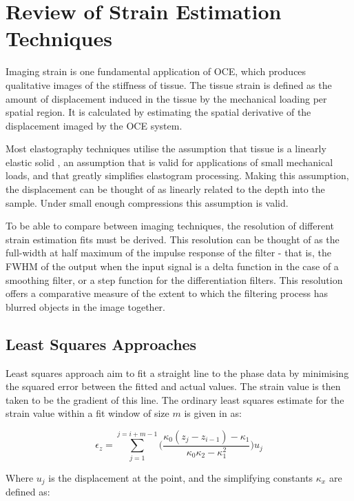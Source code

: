 \chapter{Review of Strain Estimation Techniques}\label{review}

Imaging strain is one fundamental application of OCE, which produces qualitative images of the stiffness of tissue. The tissue strain is defined as the amount of displacement induced in the tissue by the mechanical loading per spatial region. It is calculated by estimating the spatial derivative of the displacement imaged by the OCE system. 

Most elastography techniques utilise the assumption that tissue is a linearly elastic solid \cite{kennedy_review_2014}, an assumption that is valid for applications of small mechanical loads, and that greatly simplifies elastogram processing. Making this assumption, the displacement can be thought of as linearly related to the depth into the sample. Under small enough compressions this assumption is valid. 

To be able to compare between imaging techniques, the resolution of different strain estimation fits must be derived. This resolution can be thought of as the full-width at half maximum of the impulse response of the filter - that is, the FWHM of the output when the input signal is a delta function in the case of a smoothing filter, or a step function for the differentiation filters. This resolution offers a comparative measure of the extent to which the filtering process has blurred objects in the image together. 

\section{Least Squares Approaches}\label{least_squares}
Least squares approach aim to fit a straight line to the phase data by minimising the squared error between the fitted and actual values. The strain value is then taken to be the gradient of this line. The ordinary least squares estimate for the strain value within a fit window of size $m$ is given in \cite{kennedy_strain_2012} as:

\begin{equation}
	\label{ols_strain}
	\epsilon_z = \sum\limits_{j=1}^{j=i+m-1} \bigg(\frac{\kappa_0 (z_j-z_{i-1})-\kappa_1}{\kappa_0 \kappa_2 - \kappa_1^2} \bigg) u_j
\end{equation}

Where $u_j$ is the displacement at the point, and the simplifying constants $\kappa_x$ are defined as:

